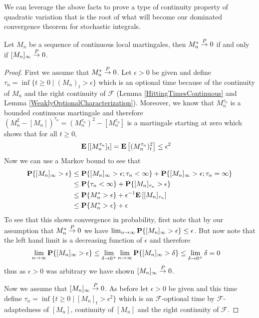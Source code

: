 We can leverage the above facts to prove a type of continuity property of quadratic variation that is the root of what will become our dominated convergence theorem for stochastic integrals.
\begin{lem}\label{QuadraticCovariationAndContinuity}Let $M_n$ be a sequence of continuous local martingales, then $M_n^* \overset{P}\to 0$ if and only if $[M_n]_\infty \overset{P}\to 0$.
\end{lem}
\begin{proof}
First we assume that $M_n^* \overset{P}\to 0$.  Let $\epsilon > 0$ be given and define $\tau_n = \inf \lbrace t \geq 0 \mid (M_n)_t > \epsilon \rbrace$ which is an optional time because of the continuity of $M_n$ and the right continuity of $\mathcal{F}$ (Lemma \ref{HittingTimesContinuous} and Lemma \ref{WeaklyOptionalCharacterization}).  Moreover, we know that $M^{\tau_n}_n$ is a bounded continuous martingale and therefore $(M^2_n - [M_n])^{\tau_n} = (M^{\tau_n}_n)^2 - [M^{\tau_n}_n]$ is a martingale starting at zero which shows that for all $t \geq 0$,
\begin{align*}
\textbf{E}\left[[M^{\tau_n}_n]_t\right] &=  \textbf{E}\left[(M^{\tau_n}_n)_t^2\right] \leq \epsilon^2
\end{align*}
Now we can use a Markov bound to see that
\begin{align*}
\textbf{P}\{[M_n]_\infty > \epsilon\} &\leq \textbf{P}\{[M_n]_\infty > \epsilon; \tau_n < \infty \} + \textbf{P}\{[M_n]_\infty > \epsilon; \tau_n = \infty \} \\
&\leq \textbf{P}\{ \tau_n < \infty \} + \textbf{P}\{[M_n]_{\tau_n} > \epsilon\} \\
&\leq \textbf{P}\{ M^*_n > \epsilon \} + \epsilon^{-1} \textbf{E}\left[[M_n]_{\tau_n}\right] \\
&\leq \textbf{P}\{ M^*_n > \epsilon \} + \epsilon
\end{align*}
To see that this shows convergence in probability, first note that by our assumption that $M^*_n \overset{P}\to 0$ we have $\lim_{n \to \infty} \textbf{P}\{[M_n]_\infty > \epsilon\} \leq \epsilon$.  But now note that the left hand limit is a decreasing function of $\epsilon$ and therefore 
\begin{align*}
\lim_{n \to \infty} \textbf{P}\{[M_n]_\infty > \epsilon\} &\leq \lim_{\delta \to 0^+} \lim_{n \to \infty} \textbf{P}\{[M_n]_\infty > \delta\} \leq \lim_{\delta \to 0^+} \delta = 0
\end{align*}
thus as $\epsilon > 0$ was arbitrary we have shown $[M_n]_\infty \overset{P}\to 0$.

Now we assume that $[M_n]_\infty \overset{P}\to 0$.  As before let $\epsilon > 0$ be given and this time define $\tau_n = \inf \lbrace t \geq 0 \mid [M_n]_t > \epsilon^2 \rbrace$ which is an $\mathcal{F}$-optional time by $\mathcal{F}$-adaptedness of $[M_n]$, continuity of $[M_n]$ and the right continuity of $\mathcal{F}$.  


\end{proof}
